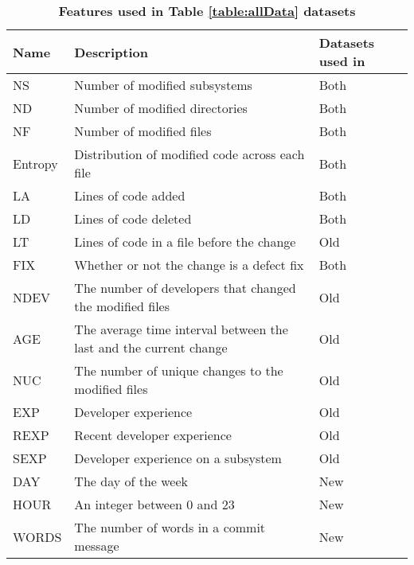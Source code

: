 \documentclass[../main.tex]{subfiles}
\begin{document}
\begin{table}[H]
    \centering
   \begin{tabular}{|p{15mm} |p{85mm} |p{30mm} |} 
        \hline
        \textbf{Name} & \textbf{Description} & \textbf{Datasets used in}\\ 
        \hline\hline
        NS & Number of modified subsystems & Both\\
        \hline
        ND & Number of modified directories & Both\\
        \hline
        NF & Number of modified files & Both\\
        \hline
        Entropy & Distribution of modified code across each file & Both\\
        \hline
        LA & Lines of code added& Both\\
        \hline
        LD & Lines of code deleted & Both\\
        \hline
        LT & Lines of code in a file before the change & Old \\
        \hline
        FIX & Whether or not the change is a defect fix & Both\\
        \hline
        NDEV & The number of developers that changed the modified files & Old \\
        \hline
        AGE & The average time interval between the last and the current change & Old\\
        \hline
        NUC & The number of unique changes to the modified files & Old\\
        \hline
        EXP & Developer experience & Old \\
        \hline
        REXP & Recent developer experience & Old \\
        \hline
        SEXP & Developer experience on a subsystem & Old \\
        \hline
        DAY & The day of the week & New\\
        \hline
        HOUR & An integer between 0 and 23 & New\\
        \hline
        WORDS & The number of words in a commit message & New\\
        \hline

\end{tabular}
    \caption{\textbf{Features used in Table \ref{table:allData} datasets}}
    \label{table:Features}
\end{table}
\end{document}
